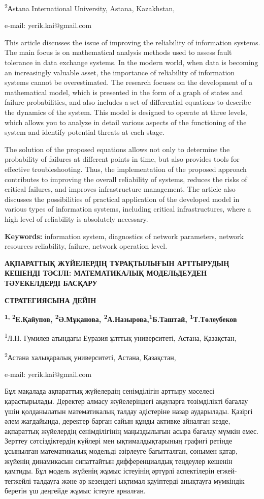 \textsuperscript{2}Аstana International University, Astana, Kazakhstan,

e-mail: yerik.kai@gmail.com

This article discusses the issue of improving the reliability of
information systems. The main focus is on mathematical analysis methods
used to assess fault tolerance in data exchange systems. In the modern
world, when data is becoming an increasingly valuable asset, the
importance of reliability of information systems cannot be
overestimated. The research focuses on the development of a mathematical
model, which is presented in the form of a graph of states and failure
probabilities, and also includes a set of differential equations to
describe the dynamics of the system. This model is designed to operate
at three levels, which allows you to analyze in detail various aspects
of the functioning of the system and identify potential threats at each
stage.

The solution of the proposed equations allows not only to determine the
probability of failures at different points in time, but also provides
tools for effective troubleshooting. Thus, the implementation of the
proposed approach contributes to improving the overall reliability of
systems, reduces the risks of critical failures, and improves
infrastructure management. The article also discusses the possibilities
of practical application of the developed model in various types of
information systems, including critical infrastructures, where a high
level of reliability is absolutely necessary.

\textbf{Keywords:} information system, diagnostics of network
parameters, network resources reliability, failure, network operation
level.

\textbf{АҚПАРАТТЫҚ ЖҮЙЕЛЕРДІҢ ТҰРАҚТЫЛЫҒЫН АРТТЫРУДЫҢ КЕШЕНДІ ТӘСІЛІ:
МАТЕМАТИКАЛЫҚ МОДЕЛЬДЕУДЕН ТӘУЕКЕЛДЕРДІ БАСҚАРУ}

\textbf{СТРАТЕГИЯСЫНА ДЕЙІН}

\textbf{\textsuperscript{1, 2}Е.Қайупов, \textsuperscript{2}Ә.Мұқанова,
\textsuperscript{2}А.Назырова,\textsuperscript{1}Б.Таштай,
\textsuperscript{1}Т.Төлеубеков}

\textsuperscript{1}Л.Н. Гумилев атындағы Еуразия ұлттық университеті,
Астана, Қазақстан,

\textsuperscript{2}Астана халықаралық университеті, Астана, Қазақстан,

e-mail: yerik.kai@gmail.com

Бұл мақалада ақпараттық жүйелердің сенімділігін арттыру мәселесі
қарастырылады. Деректер алмасу жүйелеріндегі ақауларға төзімділікті
бағалау үшін қолданылатын математикалық талдау әдістеріне назар
аударылады. Қазіргі әлем жағдайында, деректер барған сайын құнды активке
айналған кезде, ақпараттық жүйелердің сенімділігінің маңыздылығын асыра
бағалау мүмкін емес. Зерттеу сәтсіздіктердің күйлері мен
ықтималдықтарының графигі ретінде ұсынылған математикалық модельді
әзірлеуге бағытталған, сонымен қатар, жүйенің динамикасын сипаттайтын
дифференциалдық теңдеулер кешенін қамтиды. Бұл модель жүйенің жұмыс
істеуінің әртүрлі аспектілерін егжей-тегжейлі талдауға және әр кезеңдегі
ықтимал қауіптерді анықтауға мүмкіндік беретін үш деңгейде жұмыс істеуге
арналған.

